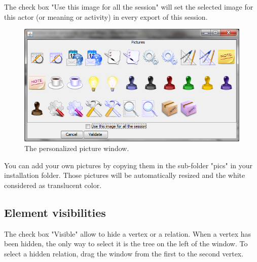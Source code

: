 The check box "Use this image for all the session" will set the selected image for this actor (or meaning or activity) in every export of this session.\\


\begin{figure}[h!]
\centering
\includegraphics[scale=0.65]{images/choix_image.png}
\caption{The personalized picture window.}
\end{figure}

You can add your own pictures by copying them in the sub-folder "pics" in your \tria installation folder. Those pictures will be automatically resized and the white considered as translucent color. 


\subsection{Element visibilities}
The check box "Visible" allow to hide a vertex or a relation. When a vertex has been hidden, the only way to select it is the tree on the left of the window. To select a hidden relation, drag the window from the first to the second vertex.\\

